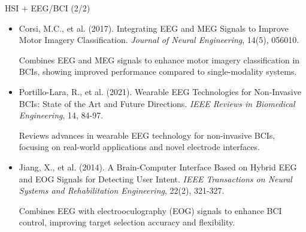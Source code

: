 \documentclass[10pt,svgnames,fragile]{beamer}
\begin{document}
\begin{frame}{HSI + EEG/BCI (2/2)}
\footnotesize
\begin{itemize}
    \item Corsi, M.C., et al. (2017). Integrating EEG and MEG Signals to Improve Motor Imagery Classification. \textit{Journal of Neural Engineering}, 14(5), 056010. \href{https://consensus.app/papers/integrating-signals-improve-motor-imagery-corsi/952af2ce3ef55c94a5fcedf7fbb7ffbe/?utm_source=chatgpt}{\color{blue}{DOI: 10.1088/1741-2552/aa87d2}}

    {\color{gray}Combines EEG and MEG signals to enhance motor imagery classification in BCIs, showing improved performance compared to single-modality systems.}

    \item Portillo-Lara, R., et al. (2021). Wearable EEG Technologies for Non-Invasive BCIs: State of the Art and Future Directions. \textit{IEEE Reviews in Biomedical Engineering}, 14, 84-97. \href{https://consensus.app/papers/mind-stateoftheart-technologies-applications-eegbased-portillolara/b5f98d6cf787507cb6ffcae48ff8a313/?utm_source=chatgpt}{\color{blue}{DOI: 10.1109/RBME.2020.2970354}}

    {\color{gray}Reviews advances in wearable EEG technology for non-invasive BCIs, focusing on real-world applications and novel electrode interfaces.}

    \item Jiang, X., et al. (2014). A Brain-Computer Interface Based on Hybrid EEG and EOG Signals for Detecting User Intent. \textit{IEEE Transactions on Neural Systems and Rehabilitation Engineering}, 22(2), 321-327. \href{https://consensus.app/papers/braincomputer-interface-based-signals-jiang/24a2ced8418855838524bb9921769bae/?utm_source=chatgpt}{\color{blue}{DOI: 10.1109/TNSRE.2013.2294695}}

    {\color{gray}Combines EEG with electrooculography (EOG) signals to enhance BCI control, improving target selection accuracy and flexibility.}
\end{itemize}
\end{frame}
\end{document}
